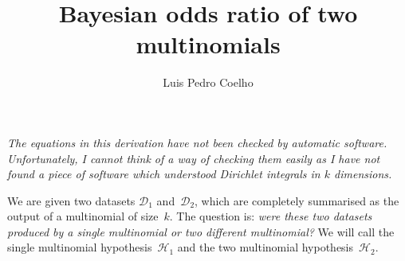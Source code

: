 \documentclass{article}
\begin{document}
\title{Bayesian odds ratio of two multinomials}
\author{Luis Pedro Coelho}
\maketitle

\emph{The equations in this derivation have not been checked by automatic
software. Unfortunately, I cannot think of a way of checking them easily as I
have not found a piece of software which understood Dirichlet integrals in $k$
dimensions.}

\bigbreak

We are given two datasets $\mathcal{D}_1$ and~$\mathcal{D}_2$, which are
completely summarised as the output of a multinomial of size~$k$. The question
is: \emph{were these two datasets produced by a single multinomial or two
different multinomial?} We will call the single multinomial
hypothesis~$\mathcal{H}_1$ and the two multinomial hypothesis~$\mathcal{H}_2$.
\end{document}
